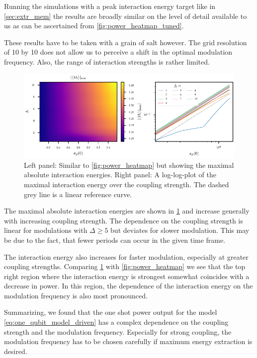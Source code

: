 Running the simulations with a peak interaction energy target like in
\cref{sec:extr_mem} the results are broadly similar on the level of
detail available to us as can be ascertained from
\cref{fig:power_heatmap_tuned}.

These results have to be taken with a grain of salt however. The grid
resolution of 10 by 10 does not allow us to perceive a shift in the
optimal modulation frequency. Also, the range of interaction strengths
is rather limited.


\begin{figure}[htb]
  \centering
  \includegraphics{figs/one_bath_mod/interaction_nontuned}
  \caption{\label{fig:interaction_nontuned} Left panel: Similar to
    \cref{fig:power_heatmap} but showing the maximal absolute
    interaction energies. Right panel: A log-log-plot of the maximal
    interaction energy over the coupling strength. The dashed grey
    line is a linear reference curve.}
\end{figure}

The maximal absolute interaction energies are shown in
\cref{fig:interaction_nontuned} and increase generally with increasing
coupling strength. The dependence on the coupling strength is linear
for modulations with \(Δ\geq 5\) but deviates for slower
modulation. This may be due to the fact, that fewer periods can occur
in the given time frame.

The interaction energy also increases for faster modulation,
especially at greater coupling strengths. Comparing
\cref{fig:interaction_nontuned} with \cref{fig:power_heatmap} we see
that the top right region where the interaction energy is strongest
somewhat coincides with a decrease in power. In this region, the
dependence of the interaction energy on the modulation frequency is
also most pronounced.


Summarizing, we found that the one shot power output for the model
\cref{eq:one_qubit_model_driven} has a complex dependence on the
coupling strength and the modulation frequency. Especially for strong
coupling, the modulation frequency has to be chosen carefully if
maximum energy extraction is desired.


